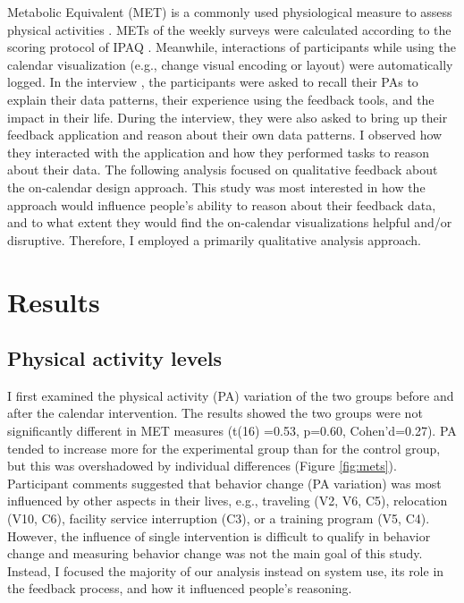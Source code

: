 \documentclass[12pt,oneside]{book}
\begin{document}
Metabolic Equivalent (MET) is a commonly used physiological measure to assess physical activities \cite{jette_metabolic_1990}. METs of the weekly surveys were calculated according to the scoring protocol of IPAQ \cite{ipaq}. Meanwhile, interactions of participants while using the calendar visualization (e.g., change visual encoding or layout) were automatically logged. In the interview , the participants were asked to recall their PAs to explain their data patterns, their experience using the feedback tools, and the impact in their life. During the interview, they were also asked to bring up their feedback application and reason about their own data patterns. I observed how they interacted with the application and how they performed tasks to reason about their data.
The following analysis focused on qualitative feedback about the on-calendar design approach. This study was most interested in how the approach would influence people's ability to reason about their feedback data, and to what extent they would find the on-calendar visualizations helpful and/or disruptive. Therefore, I employed a primarily qualitative analysis approach.


\section {Results}
\subsection{Physical activity levels}
I first examined the physical activity (PA) variation of the two groups before and after the calendar intervention. The results showed the two groups were not significantly different in MET measures (t(16) =0.53, p=0.60, Cohen\rq d=0.27). PA tended to increase more for the experimental group than for the control group, but this was overshadowed by individual differences (Figure \ref{fig:mets}). Participant comments suggested that behavior change (PA variation) was most influenced by other aspects in their lives, e.g., traveling (V2, V6, C5), relocation (V10, C6), facility service interruption (C3), or a training program (V5, C4). However, the influence of single intervention is difficult to qualify in behavior change and measuring behavior change was not the main goal of this study.
Instead, I focused the majority of our analysis instead on system use, its role in the feedback process, and how it influenced people's reasoning.
\end{document}
